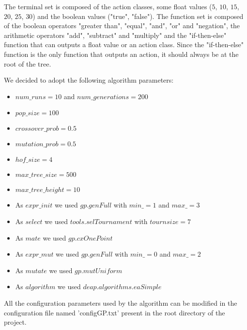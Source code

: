 The terminal set is composed of the action classes, some float values ($5$, $10$, $15$, $20$, $25$, $30$)
and the boolean values ("true", "false"). The function set is composed of the
boolean operators "greater than", "equal", "and", "or" and "negation", the arithmetic operators
"add", "subtract" and "multiply" and the "if-then-else" function that can outputs a float value or
an action class. Since the "if-then-else" function is the only function that outputs an action, it
should always be at the root of the tree.

We decided to adopt the following algorithm parameters:
\begin{itemize}
    \item $num\_runs = 10$ and $num\_generations = 200$
    \item $pop\_size = 100$
    \item $crossover\_prob = 0.5$
    \item $mutation\_prob = 0.5$
    \item $hof\_size = 4$
    \item $max\_tree\_size = 500$
    \item $max\_tree\_height = 10$
    \item As $expr\_init$ we used $gp.genFull$ with $min\_ = 1$ and $max\_ = 3$
    \item As $select$ we used $tools.selTournament$ with $tournsize = 7$
    \item As $mate$ we used $gp.cxOnePoint$
    \item As $expr\_mut$ we used $gp.genFull$ with $min\_ = 0$ and $max\_ = 2$
    \item As $mutate$ we used $gp.mutUniform$
    \item As $algorithm$ we used $deap.algorithms.eaSimple$
\end{itemize}

All the configuration parameters used by the algorithm can be modified in the configuration
file named 'configGP.txt' present in the root directory of the project.
